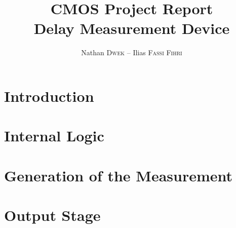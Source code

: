 
\title{CMOS Project Report\\Delay Measurement Device}
\author{Nathan \textsc{Dwek} -- Ilias \textsc{Fassi Fihri}}


\maketitle
\tableofcontents
\clearpage
\hypersetup{allcolors=link}
\section{Introduction}


\section{Internal Logic}


\section{Generation of the Measurement}


\section{Output Stage}



